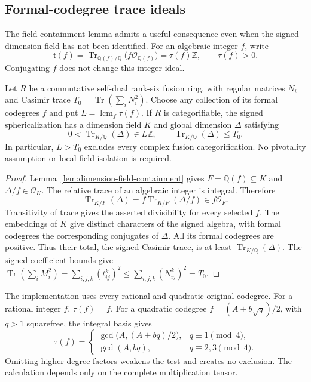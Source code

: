 \subsection{Formal-codegree trace ideals}
\label{subsec:formal-codegree-trace-ideals}

The field-containment lemma admits a useful consequence even when the signed
dimension field has not been identified.  For an algebraic integer $f$, write
\[
\mathfrak t(f)=\operatorname{Tr}_{\mathbb Q(f)/\mathbb Q}
       \bigl(f\mathcal O_{\mathbb Q(f)}\bigr)=\tau(f)\mathbb Z,
\qquad \tau(f)>0.
\]
Conjugating $f$ does not change this integer ideal.

\begin{theorem}
\label{thm:formal-codegree-trace-ideal}
Let $R$ be a commutative self-dual rank-six fusion ring, with regular matrices
$N_i$ and Casimir trace $T_0=\operatorname{Tr}(\sum_iN_i^2)$.
Choose any collection of its formal codegrees $f$ and put
$L=\operatorname{lcm}_f\tau(f)$.
If $R$ is categorifiable, the signed sphericalization has a dimension field
$K$ and global dimension $\Delta$ satisfying
\[
0<\operatorname{Tr}_{K/\mathbb Q}(\Delta)\in L\mathbb Z,
\qquad
\operatorname{Tr}_{K/\mathbb Q}(\Delta)\le T_0.
\]
In particular, $L>T_0$ excludes every complex fusion categorification.
No pivotality assumption or local-field isolation is required.
\end{theorem}
\begin{proof}
Lemma~\ref{lem:dimension-field-containment} gives $F=\mathbb Q(f)\subseteq K$
and $\Delta/f\in\mathcal O_K$.  The relative trace of an algebraic integer
is integral.  Therefore
\[
\operatorname{Tr}_{K/F}(\Delta)
=f\operatorname{Tr}_{K/F}(\Delta/f)\in f\mathcal O_F.
\]
Transitivity of trace gives the asserted divisibility for every selected $f$.
The embeddings of $K$ give distinct characters of the signed algebra, with
formal codegrees the corresponding conjugates of $\Delta$.  All its formal
codegrees are positive.  Thus their total, the signed Casimir trace, is at
least $\operatorname{Tr}_{K/\mathbb Q}(\Delta)$.  The signed coefficient
bounds give
$\operatorname{Tr}(\sum_iM_i^2)=\sum_{i,j,k}(t_{ij}^k)^2
\le\sum_{i,j,k}(N_{ij}^k)^2=T_0$.
\end{proof}

The implementation uses every rational and quadratic original codegree.
For a rational integer $f$, $\tau(f)=f$.  For a quadratic codegree
$f=(A+b\sqrt q)/2$, with $q>1$ squarefree, the integral basis gives
\[
\tau(f)=
\begin{cases}
\gcd\bigl(A,(A+bq)/2\bigr),&q\equiv1\pmod4,\\
\gcd(A,bq),&q\equiv2,3\pmod4.
\end{cases}
\]
Omitting higher-degree factors weakens the test and creates no exclusion.
The calculation depends only on the complete multiplication tensor.

